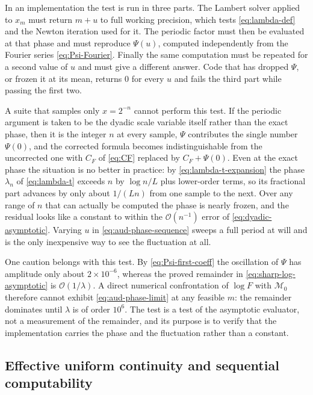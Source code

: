 \documentclass[11pt,oneside]{article}
\theoremstyle{definition}
\theoremstyle{remark}
\newcommand{\bigO}{\mathcal O}
\begin{document}
In an implementation the test is run in three parts.  The Lambert solver applied to $x_{m}$
must return $m+u$ to full working precision, which tests \eqref{eq:lambda-def} and the
Newton iteration used for it.  The periodic factor must then be evaluated at that phase and
must reproduce $\Psi(u)$, computed independently from the Fourier series
\eqref{eq:Psi-Fourier}.  Finally the same computation must be repeated for a second value of
$u$ and must give a different answer.  Code that has dropped $\Psi$, or frozen it at its
mean, returns $0$ for every $u$ and fails the third part while passing the first two.

A suite that samples only $x=2^{-n}$ cannot perform this test.  If the periodic argument is
taken to be the dyadic scale variable itself rather than the exact phase, then it is the
integer $n$ at every sample, $\Psi$ contributes the single number $\Psi(0)$, and the
corrected formula becomes indistinguishable from the uncorrected one with $C_{F}$ of
\eqref{eq:CF} replaced by $C_{F}+\Psi(0)$.  Even at the exact phase the situation is no
better in practice: by \eqref{eq:lambda-t-expansion} the phase $\lambda_{n}$ of
\eqref{eq:lambda-t} exceeds $n$ by $\log n/L$ plus lower-order terms, so its fractional part
advances by only about $1/(Ln)$ from one sample to the next.  Over any range of $n$ that can
actually be computed the phase is nearly frozen, and the residual looks like a constant to
within the $\bigO(n^{-1})$ error of \eqref{eq:dyadic-asymptotic}.  Varying $u$ in
\eqref{eq:aud-phase-sequence} sweeps a full period at will and is the only inexpensive way to
see the fluctuation at all.

One caution belongs with this test.  By \eqref{eq:Psi-first-coeff} the oscillation of $\Psi$
has amplitude only about $2\times10^{-6}$, whereas the proved remainder in
\eqref{eq:sharp-log-asymptotic} is $\bigO(1/\lambda)$.  A direct numerical confrontation of
$\log F$ with $\mathcal M_{0}$ therefore cannot exhibit \eqref{eq:aud-phase-limit} at any
feasible $m$: the remainder dominates until $\lambda$ is of order $10^{6}$.  The test is a
test of the asymptotic evaluator, not a measurement of the remainder, and its purpose is to
verify that the implementation carries the phase and the fluctuation rather than a constant.

\subsection{Effective uniform continuity and sequential computability}
\label{sec:effective-computability}
\end{document}
